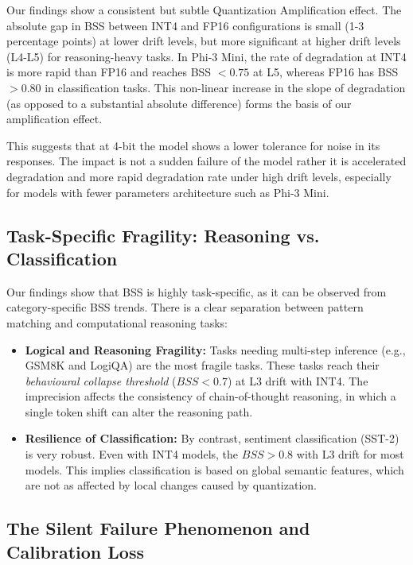 \documentclass[conference]{IEEEtran}
\begin{document}
Our findings show a consistent but subtle Quantization Amplification effect. The absolute gap in BSS between INT4 and FP16 configurations is small (1-3 percentage points) at lower drift levels, but more significant at higher drift levels (L4-L5) for reasoning-heavy tasks. In Phi-3 Mini, the rate of degradation at INT4 is more rapid than FP16 and reaches BSS $< 0.75$ at L5, whereas FP16 has BSS $> 0.80$ in classification tasks. This non-linear increase in the slope of degradation (as opposed to a substantial absolute difference) forms the basis of our amplification effect.

This suggests that at 4-bit the model shows a lower tolerance for noise in its responses. The impact is not a sudden failure of the model rather it is accelerated degradation and more rapid degradation rate under high drift levels, especially for models with fewer parameters architecture such as Phi-3 Mini.

\subsection{Task-Specific Fragility: Reasoning vs. Classification}

Our findings show that BSS is highly task-specific, as it can be observed from category-specific BSS trends. There is a clear separation between pattern matching and computational reasoning tasks:

\begin{itemize}
\item \textbf{Logical and Reasoning Fragility:} Tasks needing multi-step inference (e.g., GSM8K and LogiQA) are the most fragile tasks. These tasks reach their \textit{behavioural collapse threshold} ($BSS < 0.7$) at L3 drift with INT4. The imprecision affects the consistency of chain-of-thought reasoning, in which a single token shift can alter the reasoning path.
\item \textbf{Resilience of Classification:} By contrast, sentiment classification (SST-2) is very robust. Even with INT4 models, the $BSS > 0.8$ with L3 drift for most models. This implies classification is based on global semantic features, which are not as affected by local changes caused by quantization.
\end{itemize}

\subsection{The Silent Failure Phenomenon and Calibration Loss}
\end{document}
